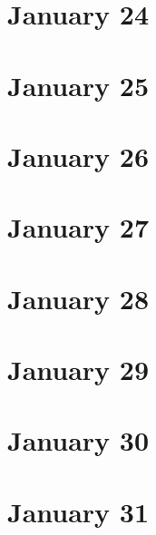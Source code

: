 \section{January 24}

\section{January 25}

\section{January 26}

\section{January 27}

\section{January 28}

\section{January 29}

\section{January 30}

\section{January 31}

